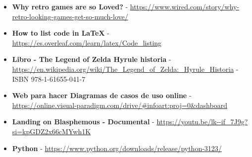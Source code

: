 \documentclass[a4paper]{article}
\begin{document}
\begin{itemize}
    \item \textbf{Why retro games are so Loved?} - \url{https://www.wired.com/story/why-retro-looking-games-get-so-much-love/}
    \item \textbf{How to list code in LaTeX} - \url{https://es.overleaf.com/learn/latex/Code_listing}
    \item \textbf{Libro - The Legend of Zelda Hyrule historia} - \url{https://en.wikipedia.org/wiki/The_Legend_of_Zelda:_Hyrule_Historia} - ISBN 978-1-61655-041-7
    \item \textbf{Web para hacer Diagramas de casos de uso online} - \url{https://online.visual-paradigm.com/drive/#infoart:proj=0&dashboard}
    \item \textbf{Landing on Blasphemous - Documental} - \url{https://youtu.be/lk--if_7J9g?si=kpGDZ2x66cMYwh1K}
    \item \textbf{Python} - \url{https://www.python.org/downloads/release/python-3123/}
\end{itemize}

\clearpage
\end{document}
